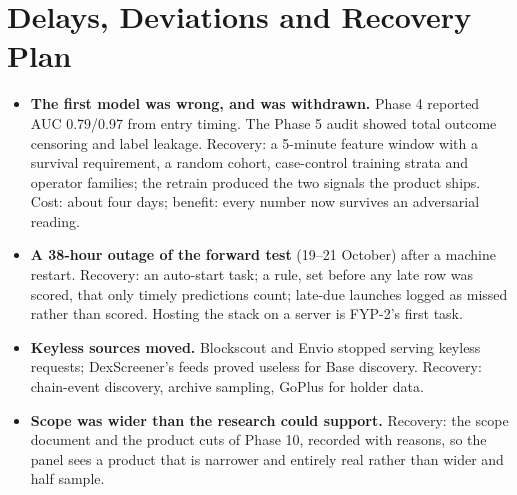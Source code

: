 \section{Delays, Deviations and Recovery Plan}
\begin{itemize}
  \item \textbf{The first model was wrong, and was withdrawn.} Phase 4 reported AUC 0.79/0.97 from entry timing. The Phase 5 audit showed total outcome censoring and label leakage. Recovery: a 5-minute feature window with a survival requirement, a random cohort, case-control training strata and operator families; the retrain produced the two signals the product ships. Cost: about four days; benefit: every number now survives an adversarial reading.
  \item \textbf{A 38-hour outage of the forward test} (19--21 October) after a machine restart. Recovery: an auto-start task; a rule, set before any late row was scored, that only timely predictions count; late-due launches logged as missed rather than scored. Hosting the stack on a server is FYP-2's first task.
  \item \textbf{Keyless sources moved.} Blockscout and Envio stopped serving keyless requests; DexScreener's feeds proved useless for Base discovery. Recovery: chain-event discovery, archive sampling, GoPlus for holder data.
  \item \textbf{Scope was wider than the research could support.} Recovery: the scope document and the product cuts of Phase 10, recorded with reasons, so the panel sees a product that is narrower and entirely real rather than wider and half sample.
\end{itemize}
